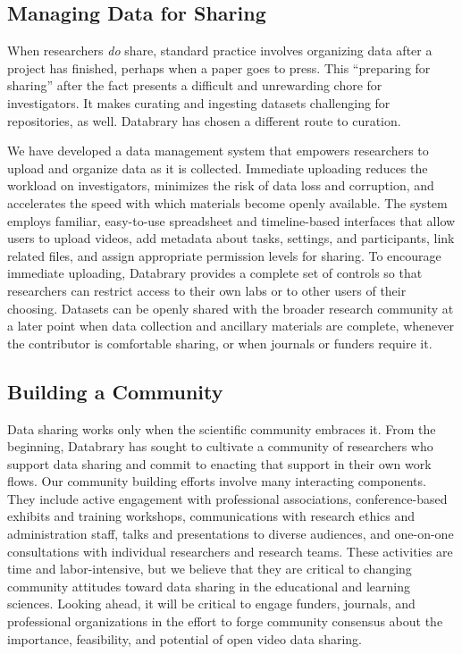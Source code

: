 \documentclass[letterpaper,man,apacite]{apa6}
\begin{document}
\subsection{Managing Data for Sharing}
When researchers \emph{do} share, standard practice involves organizing data after a project has finished, perhaps when a paper goes to press. 
This “preparing for sharing” after the fact presents a difficult and unrewarding chore for investigators. 
It makes curating and ingesting datasets challenging for repositories, as well.
Databrary has chosen a different route to curation.

We have developed a data management system that empowers researchers to upload and organize data as it is collected.
Immediate uploading reduces the workload on investigators, minimizes the risk of data loss and corruption, and accelerates the speed with which materials become openly available. 
The system employs familiar, easy-to-use spreadsheet and timeline-based interfaces that allow users to upload videos, add metadata about tasks, settings, and participants, link related files, and assign appropriate permission levels for sharing. 
To encourage immediate uploading, Databrary provides a complete set of controls so that researchers can restrict access to their own labs or to other users of their choosing. 
Datasets can be openly shared with the broader research community at a later point when data collection and ancillary materials are complete, whenever the contributor is comfortable sharing, or when journals or funders require it.

\subsection{Building a Community}
Data sharing works only when the scientific community embraces it. 
From the beginning, Databrary has sought to cultivate a community of researchers who support data sharing and commit to enacting that support in their own work flows. 
Our community building efforts involve many interacting components. 
They include active engagement with professional associations, conference-based exhibits and training workshops, communications with research ethics and administration staff, talks and presentations to diverse audiences, and one-on-one consultations with individual researchers and research teams. 
These activities are time and labor-intensive, but we believe that they are critical to changing community attitudes toward data sharing in the educational and learning sciences. 
Looking ahead, it will be critical to engage funders, journals, and professional organizations in the effort to forge community consensus about the importance, feasibility, and potential of open video data sharing.
\end{document}
